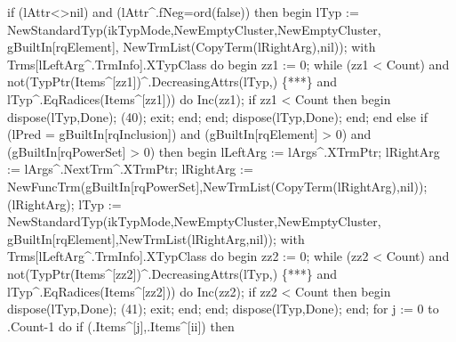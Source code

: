                   if (lAttr<>nil) and (lAttr^.fNeg=ord(false)) then
                  begin
                     lTyp := NewStandardTyp(ikTypMode,NewEmptyCluster,NewEmptyCluster,
                                            gBuiltIn[rqElement],
                                            NewTrmList(CopyTerm(lRightArg),nil));
                     with Trms[lLeftArg^.TrmInfo].XTypClass do
                     begin
                        zz1 := 0;
                        while (zz1 < Count) and not(TypPtr(Items^[zz1])^.DecreasingAttrs(lTyp,)  \{***\}
                                                    and lTyp^.EqRadices(Items^[zz1])) do Inc(zz1);
                        if zz1 < Count then
                        begin
                           dispose(lTyp,Done);
                           (40);
                           exit;
                        end;
                     end;
                     dispose(lTyp,Done);
                  end;
                  end
                  else if (lPred = gBuiltIn[rqInclusion]) and
                             (gBuiltIn[rqElement] > 0) and (gBuiltIn[rqPowerSet] > 0)  then
                  begin
                     lLeftArg := lArgs^.XTrmPtr;
                     lRightArg := lArgs^.NextTrm^.XTrmPtr;
                     lRightArg := 
                        NewFuncTrm(gBuiltIn[rqPowerSet],NewTrmList(CopyTerm(lRightArg),nil));
                     (lRightArg);
                     lTyp := NewStandardTyp(ikTypMode,NewEmptyCluster,NewEmptyCluster,
                                            gBuiltIn[rqElement],NewTrmList(lRightArg,nil));
                     with Trms[lLeftArg^.TrmInfo].XTypClass do
                     begin
                        zz2 := 0;
                        while (zz2 < Count) and not(TypPtr(Items^[zz2])^.DecreasingAttrs(lTyp,)  \{***\}
                                                    and lTyp^.EqRadices(Items^[zz2])) do Inc(zz2);
                        if zz2 < Count then
                        begin dispose(lTyp,Done);
                        (41);
                        exit;
                        end;
                     end;
                     dispose(lTyp,Done);
                  end;
                  for j := 0 to .Count-1 do
                     if (.Items^[j],.Items^[ii]) then
